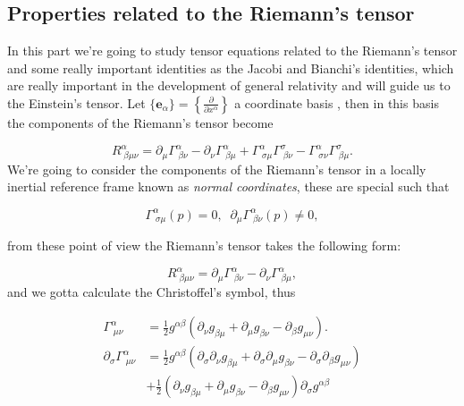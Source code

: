     \subsection{Properties related to the Riemann's tensor}

        In this part we're going to study tensor equations related to the Riemann's tensor and some really important identities as the Jacobi and Bianchi's identities, which are really important in the development of general relativity and will guide us to the Einstein's tensor. Let $\{\mathbf{e}_{\alpha}\} = \left\{\frac{\partial}{\partial x^{\alpha}} \right\}$ a coordinate basis , then in this basis the components of the Riemann's tensor become

        \begin{equation}
            R^{\alpha}_{\;\beta\mu\nu} = \partial_{\mu}\Gamma^{\alpha}_{\;\beta\nu} - \partial_{\nu}\Gamma^{\alpha}_{\;\beta\mu} + \Gamma^{\alpha}_{\;\sigma\mu}\Gamma^{\sigma}_{\;\beta\nu} - \Gamma^{\alpha}_{\;\sigma\nu}\Gamma^{\sigma}_{\;\beta\mu}.
        \end{equation}
        We're going to consider the components of the Riemann's tensor in a locally inertial reference frame known as \textit{normal coordinates}, these are special such that

        \begin{equation}
            \Gamma^{\alpha}_{\;\sigma\mu}(p)=0,\;\;\partial_{\mu}\Gamma^{\alpha}_{\;\beta\nu}(p)\neq0,
        \end{equation}

        from these point of view the Riemann's tensor takes the following form:

        \begin{equation}
            R^{\alpha}_{\;\beta\mu\nu}=\partial_{\mu}\Gamma^{\alpha}_{\;\beta\nu}-\partial_{\nu}\Gamma^{\alpha}_{\;\beta\mu},
        \end{equation}
        and we gotta calculate the Christoffel's symbol, thus

        \begin{align*}
            \Gamma^{\alpha}_{\;\mu\nu}&=\frac{1}{2}g^{\alpha\beta}\left(\partial_{\nu}g_{\beta\mu} + \partial_{\mu}g_{\beta\nu} - \partial_{\beta}g_{\mu\nu} \right).\\
            \partial_{\sigma}\Gamma^{\alpha}_{\;\mu\nu} &= \frac{1}{2}g^{\alpha\beta}\left(\partial_{\sigma}\partial_{\nu}g_{\beta\mu} + \partial_{\sigma}\partial_{\mu}g_{\beta\nu} - \partial_{\sigma}\partial_{\beta}g_{\mu\nu} \right)\\
            &+ \frac{1}{2}\left(\partial_{\nu}g_{\beta\mu} + \partial_{\mu}g_{\beta\nu} - \partial_{\beta}g_{\mu\nu} \right)\partial_{\sigma}g^{\alpha\beta}
        \end{align*}

